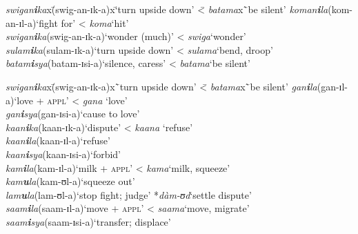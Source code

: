 \begin{exe}
\ex \label{exHighVowelRaisingAfterReciprocalPositional}
\begin{tabbing}
\textit{swigan\textbf{i}ka}x\=(\degree swig-an-ɪk-a)x\=\lq turn upside down' \= < \textit{batama}x\=`be silent'\kill%
\textit{koman\textbf{i}la}\>(\degree kom-an-ɪl-a)\>`fight for'\> < \textit{koma}\>`hit'\\
\textit{swigan\textbf{i}ka}\>(\degree swig-an-ɪk-a)\>`wonder (much)' \> < \textit{swiga}\>`wonder' \\
\textit{sulam\textbf{i}ka}\>(\degree sulam-ɪk-a)\>`turn upside down'\> < \textit{sulama}\>`bend, droop'\\
\textit{batam\textbf{i}sya}\>(\degree batam-ɪsi-a)\>`silence, caress'\> < \textit{batama}\>`be silent'
\end{tabbing}
\ex
\label{exHighVowelRaisingAfteranmRootfinal}
\begin{tabbing}
\textit{swigan\textbf{i}ka}x\=(\degree swig-an-ɪk-a)x\=`turn upside down' \= < \textit{batama}x\=`be silent'\kill%
\textit{gan\textbf{i}la}\>(\degree gan-ɪl-a)\>`love + \textsc{appl}'\> < \textit{gana} \>`love'\\
\textit{gan\textbf{i}sya}\>(\degree gan-ɪsi-a)\>`cause to love'
\\\textit{kaan\textbf{i}ka}\>(\degree kaan-ɪk-a)\>`dispute'\> < \textit{kaana}\> `refuse'\\
\textit{kaan\textbf{i}la}\>(\degree kaan-ɪl-a)\>`refuse'\\
\textit{kaan\textbf{i}sya}\>(\degree kaan-ɪsi-a)\>`forbid'\\
\textit{kam\textbf{i}la}\>(\degree kam-ɪl-a)\>`milk + \textsc{appl}'\> < \textit{kama}\>`milk, squeeze'
\\ \textit{kam\textbf{u}la}\>(\degree kam-ʊl-a)\>`squeeze out'
\\ \textit{lam\textbf{u}la}\>(\degree lam-ʊl-a)\>`stop fight; judge'\> *\textit{dàm-ʊd}\>`settle dispute'
\\ \textit{saam\textbf{i}la}\>(\degree saam-ɪl-a)\>`move + \textsc{appl}'\> < \textit{saama}\>`move, migrate'
\\ \textit{saam\textbf{i}sya}\>(\degree saam-ɪsi-a)\>`transfer; displace'
\end{tabbing}
\end{exe}

